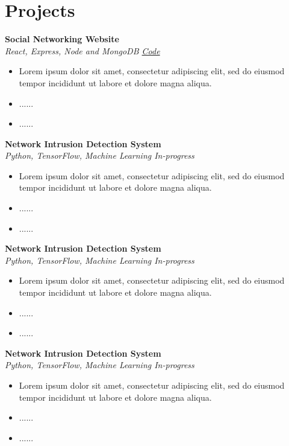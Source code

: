 \documentclass{article}
\begin{document}
\begin{minipage}[t]{0.49\textwidth}
\section*{Projects}
\noindent
\textbf{Social Networking Website}\\
\textit{React, Express, Node and MongoDB \hfill \href{link}{Code}}
\begin{itemize}
    \item Lorem ipsum dolor sit amet, consectetur adipiscing elit, sed do eiusmod tempor incididunt ut labore et dolore magna aliqua. 
    \item ......
    \item ......
\end{itemize}

\textbf{Network Intrusion Detection System}\\
\textit{Python, TensorFlow, Machine Learning \hfill In-progress}
\begin{itemize}
   \item Lorem ipsum dolor sit amet, consectetur adipiscing elit, sed do eiusmod tempor incididunt ut labore et dolore magna aliqua. 
    \item ......
    \item ......
\end{itemize}

\textbf{Network Intrusion Detection System}\\
\textit{Python, TensorFlow, Machine Learning \hfill In-progress}
\begin{itemize}
   \item Lorem ipsum dolor sit amet, consectetur adipiscing elit, sed do eiusmod tempor incididunt ut labore et dolore magna aliqua. 
    \item ......
    \item ......
\end{itemize}

\textbf{Network Intrusion Detection System}\\
\textit{Python, TensorFlow, Machine Learning \hfill In-progress}
\begin{itemize}
   \item Lorem ipsum dolor sit amet, consectetur adipiscing elit, sed do eiusmod tempor incididunt ut labore et dolore magna aliqua. 
    \item ......
    \item ......
\end{itemize}






\end{minipage}
\end{document}
